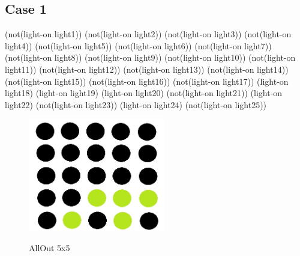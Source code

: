 \subsection{Case 1}
 \newline
 \newline
(not(light-on light1)) 
(not(light-on light2)) 
(not(light-on light3)) 
(not(light-on light4)) 
(not(light-on light5))
\newline
(not(light-on light6)) 
(not(light-on light7)) 
(not(light-on light8)) 
(not(light-on light9)) 
(not(light-on light10))
\newline
(not(light-on light11)) 
(not(light-on light12)) 
(not(light-on light13)) 
(not(light-on light14)) 
(not(light-on light15))
\newline
(not(light-on light16)) 
(not(light-on light17)) 
(light-on light18) 
(light-on light19) 
(light-on light20)
\newline
(not(light-on light21)) 
(light-on light22) 
(not(light-on light23)) 
(light-on light24) 
(not(light-on light25))
\newline
\newline
\begin{figure}[h]
\centering
\includegraphics[width=6cm]{text/images/pic5.jpeg}\\
\newline
\caption{AllOut 5x5}
\end{figure} \newline \newline

\newline\newline
\newline
